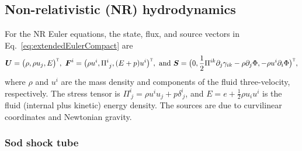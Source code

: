 \documentclass[letterpaper]{jpconf}
\newcommand{\vect}[1]{\boldsymbol{#1}}
\newcommand{\f}[2]{\frac{#1}{#2}}
\newcommand{\pd}[2]{\partial_{#2}{#1}}
\newcommand{\trans}{\textnormal{\tiny\textsc{T}}}
\begin{document}
\subsection{Non-relativistic (NR) hydrodynamics}

For the NR Euler equations, the state, flux, and source vectors in Eq.~\eqref{eq:extendedEulerCompact} are
\begin{equation}
  \vect{U}=\big(\rho,\rho u_{j},E\big)^{\trans},~
  \vect{F}^{i}=\big(\rho u^{i},\Pi^{i}_{~j},(E+p)u^{i}\big)^{\trans},~
  \text{and}~
  \vect{S}=\big(0,\f{1}{2}\Pi^{ik}\pd{\gamma_{ik}}{j}-\rho\pd{\Phi}{j},-\rho u^{i}\pd{\Phi}{i}\big)^{\trans},
\end{equation}
where $\rho$ and $u^{i}$ are the mass density and components of the fluid three-velocity, respectively.  
The stress tensor is $\Pi^{i}_{~j}=\rho u^{i} u_{j}+p\delta^{i}_{~j}$, and $E=e+\f{1}{2}\rho u_{i} u^{i}$ is the fluid (internal plus kinetic) energy density.  
The sources are due to curvilinear coordinates and Newtonian gravity.  

\subsubsection{Sod shock tube}
\end{document}
